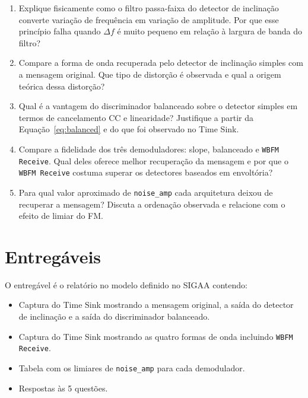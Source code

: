 \documentclass[11pt,a4paper]{article}
\begin{document}
\begin{enumerate}[label=\textbf{Q\arabic*.}, leftmargin=*]

  \item Explique fisicamente como o filtro passa-faixa do detector de
    inclinação converte variação de frequência em variação de amplitude.
    Por que esse princípio falha quando $\Delta f$ é muito pequeno em relação
    à largura de banda do filtro?

  \item Compare a forma de onda recuperada pelo detector de inclinação simples
    com a mensagem original. Que tipo de distorção é observada e qual a
    origem teórica dessa distorção?

  \item Qual é a vantagem do discriminador balanceado sobre o detector simples
    em termos de cancelamento CC e linearidade? Justifique a partir da
    Equação~\eqref{eq:balanced} e do que foi observado no Time Sink.

  \item Compare a fidelidade dos três demoduladores: slope, balanceado e
    \texttt{WBFM Receive}. Qual deles oferece melhor recuperação da mensagem
    e por que o \texttt{WBFM Receive} costuma superar os detectores baseados
    em envoltória?

  \item Para qual valor aproximado de \texttt{noise\_amp} cada arquitetura
    deixou de recuperar a mensagem? Discuta a ordenação observada e relacione
    com o efeito de limiar do FM.

\end{enumerate}

\section{Entregáveis}

O entregável é o relatório no modelo definido no SIGAA contendo:

\begin{itemize}
  \item Captura do Time Sink mostrando a mensagem original, a saída do
    detector de inclinação e a saída do discriminador balanceado.
  \item Captura do Time Sink mostrando as quatro formas de onda incluindo
    \texttt{WBFM Receive}.
  \item Tabela com os limiares de \texttt{noise\_amp} para cada demodulador.
  \item Respostas às 5 questões.
\end{itemize}
\end{document}
